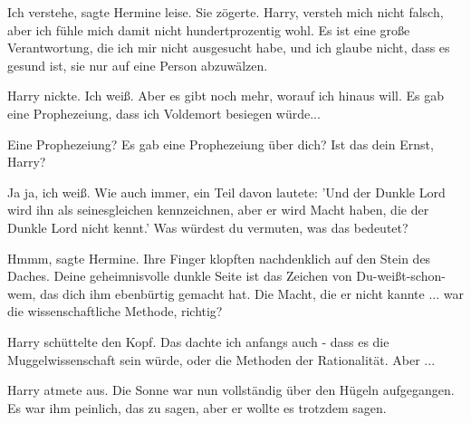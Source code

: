 \glqq{}Ich verstehe\grqq{}, sagte Hermine leise. Sie zögerte. \glqq{}Harry,
versteh mich nicht falsch, aber ich fühle mich damit nicht hundertprozentig
wohl. Es ist eine große Verantwortung, die ich mir nicht ausgesucht habe, und
ich glaube nicht, dass es gesund ist, sie nur auf eine Person abzuwälzen.\grqq{}

Harry nickte. \glqq{}Ich weiß. Aber es gibt noch mehr, worauf ich hinaus will. Es
gab eine Prophezeiung, dass ich Voldemort besiegen würde...\grqq{}

\glqq{}Eine Prophezeiung? Es gab eine Prophezeiung über dich? Ist das dein Ernst,
Harry?\grqq{}

\glqq{}Ja ja, ich weiß. Wie auch immer, ein Teil davon lautete: 'Und der Dunkle
Lord wird ihn als seinesgleichen kennzeichnen, aber er wird Macht haben, die der
Dunkle Lord nicht kennt.' Was würdest du vermuten, was das bedeutet?\grqq{}

\glqq{}Hmmm\grqq{}, sagte Hermine. Ihre Finger klopften nachdenklich auf den
Stein des Daches. \glqq{}Deine geheimnisvolle dunkle Seite ist das Zeichen von
Du-weißt-schon-wem, das dich ihm ebenbürtig gemacht hat. Die Macht, die er nicht
kannte ... war die wissenschaftliche Methode, richtig?\grqq{}

Harry schüttelte den Kopf. \glqq{}Das dachte ich anfangs auch - dass es die
Muggelwissenschaft sein würde, oder die Methoden der Rationalität. Aber ...\grqq{}

Harry atmete aus. Die Sonne war nun vollständig über den Hügeln aufgegangen. Es
war ihm peinlich, das zu sagen, aber er wollte es trotzdem sagen.

